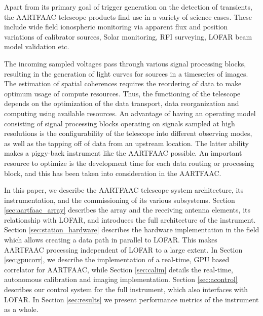 \documentclass{ws-jai}
\begin{document}
Apart  from  its  primary  goal  of  trigger  generation  on  the  detection  of
transients, the  AARTFAAC telescope products  find use  in a variety  of science
cases. These  include wide  field ionospheric monitoring  via apparent  flux and
position  variations of  calibrator  sources, Solar  monitoring, RFI  surveying,
LOFAR beam model validation etc.

The incoming  sampled voltages  pass through  various signal  processing blocks,
resulting  in the  generation of  light curves  for sources  in a  timeseries of
images.  The estimation of spatial coherences requires the reordering of data to
make optimum usage of compute resources.  Thus, the functioning of the telescope
depends  on the  optimization of  the  data transport,  data reorganization  and
computing using available resources.  An  advantage of having an operating model
consisting  of signal  processing blocks  operating on  signals sampled  at high
resolutions is  the configurability  of the  telescope into  different observing
modes, as well as the tapping off of data from an upstream location.  The latter
ability makes a piggy-back instrument  like the AARTFAAC possible.  An important
resource to optimize is the development time for each data routing or processing
block, and this has been taken into consideration in the AARTFAAC.

In  this paper,  we describe  the  AARTFAAC telescope  system architecture,  its
instrumentation,  and  the commissioning  of  its  various subsystems.   Section
\ref{sec:aartfaac_array} describes the array and the receiving antenna elements,
its  relationship  with LOFAR,  and  introduces  the  full architecture  of  the
instrument.    Section   \ref{sec:station_hardware}   describes   the   hardware
implementation in  the field which  allows creating a  data path in  parallel to
LOFAR. This  makes AARTFAAC processing independent  of LOFAR to a  large extent.
In Section \ref{sec:gpucorr}, we describe the implementation of a real-time, GPU
based  correlator  for  AARTFAAC,  while  Section  \ref{sec:calim}  details  the
real-time,   autonomous  calibration   and   imaging  implementation.    Section
\ref{sec:acontrol} describes our  control system for the  full instrument, which
also interfaces with LOFAR.  In Section \ref{sec:results} we present performance
metrics of the instrument as a whole.
\end{document}
